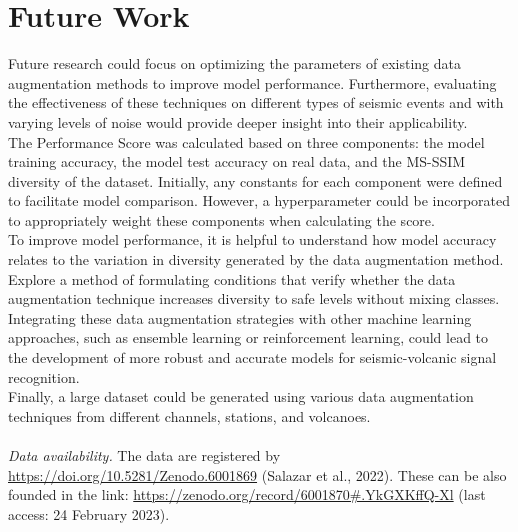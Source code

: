 \documentclass[journal]{IEEEtran}
\begin{document}
\section{Future Work}\label{future_work}
Future research could focus on optimizing the parameters of existing data augmentation methods to improve model performance. Furthermore, evaluating the effectiveness of these techniques on different types of seismic events and with varying levels of noise would provide deeper insight into their applicability. \\
The Performance Score was calculated based on three components: the model training accuracy, the model test accuracy on real data, and the MS-SSIM diversity of the dataset. Initially, any constants for each component were defined to facilitate model comparison. However, a hyperparameter could be incorporated to appropriately weight these components when calculating the score.\\
To improve model performance, it is helpful to understand how model accuracy relates to the variation in diversity generated by the data augmentation method.\\
Explore a method of formulating conditions that verify whether the data augmentation technique increases diversity to safe levels without mixing classes.\\
Integrating these data augmentation strategies with other machine learning approaches, such as ensemble learning or reinforcement learning, could lead to the development of more robust and accurate models for seismic-volcanic signal recognition.\\ 
Finally, a large dataset could be generated using various data augmentation techniques from different channels, stations, and volcanoes.
\\
\\
\textit{Data availability.} The data are registered by \href{https://doi.org/10.5281/Zenodo.6001869}{\color{blue}https://doi.org/10.5281/Zenodo.6001869} (Salazar et al., 2022). These can be also founded in the link: \href{https://zenodo.org/record/6001870#.YkGXKffQ-Xl}{\color{blue}https://zenodo.org/record/6001870\#.YkGXKffQ-Xl} (last access: 24 February 2023).
\\


\end{document}
